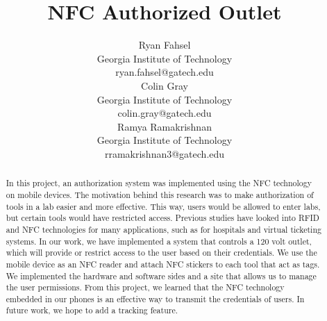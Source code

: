 \documentclass{sigchi}
\begin{document}
\title{NFC Authorized Outlet}

\author{
  \alignauthor Ryan Fahsel\\
    \affaddr Georgia Institute of Technology\\
    \email ryan.fahsel@gatech.edu\\
  \alignauthor Colin Gray\\
    \affaddr Georgia Institute of Technology\\
    \email colin.gray@gatech.edu\\
  \alignauthor Ramya Ramakrishnan\\
    \affaddr Georgia Institute of Technology\\
    \email rramakrishnan3@gatech.edu\\
}

\maketitle

\begin{abstract}
In this project, an authorization system was implemented using the NFC technology on mobile devices. The motivation behind this research was to make authorization of tools in a lab easier and more effective. This way, users would be allowed to enter labs, but certain tools would have restricted access. Previous studies have looked into RFID and NFC technologies for many applications, such as for hospitals and virtual ticketing systems. In our work, we have implemented a system that controls a 120 volt outlet, which will provide or restrict access to the user based on their credentials. We use the mobile device as an NFC reader and attach NFC stickers to each tool that act as tags. We implemented the hardware and software sides and a site that allows us to manage the user permissions. From this project, we learned that the NFC technology embedded in our phones is an effective way to transmit the credentials of users. In future work, we hope to add a tracking feature.
\end{abstract}

\end{document}
